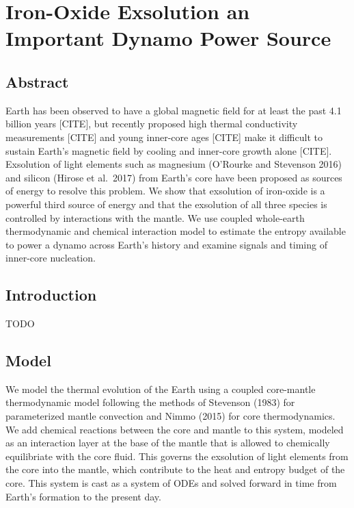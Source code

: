 \documentclass[]{article}
\date{}
\begin{document}
\hypertarget{iron-oxide-exsolution-an-important-dynamo-power-source}{%
\section{Iron-Oxide Exsolution an Important Dynamo Power
Source}\label{iron-oxide-exsolution-an-important-dynamo-power-source}}

\hypertarget{abstract}{%
\subsection{Abstract}\label{abstract}}

Earth has been observed to have a global magnetic field for at least the
past 4.1 billion years {[}CITE{]}, but recently proposed high thermal
conductivity measurements {[}CITE{]} and young inner-core ages
{[}CITE{]} make it difficult to sustain Earth's magnetic field by
cooling and inner-core growth alone {[}CITE{]}. Exsolution of light
elements such as magnesium (O'Rourke and Stevenson 2016) and silicon
(Hirose et al.~2017) from Earth's core have been proposed as sources of
energy to resolve this problem. We show that exsolution of iron-oxide is
a powerful third source of energy and that the exsolution of all three
species is controlled by interactions with the mantle. We use coupled
whole-earth thermodynamic and chemical interaction model to estimate the
entropy available to power a dynamo across Earth's history and examine
signals and timing of inner-core nucleation.

\hypertarget{introduction}{%
\subsection{Introduction}\label{introduction}}

TODO

\hypertarget{model}{%
\subsection{Model}\label{model}}

We model the thermal evolution of the Earth using a coupled core-mantle
thermodynamic model following the methods of Stevenson (1983) for
parameterized mantle convection and Nimmo (2015) for core
thermodynamics. We add chemical reactions between the core and mantle to
this system, modeled as an interaction layer at the base of the mantle
that is allowed to chemically equilibriate with the core fluid. This
governs the exsolution of light elements from the core into the mantle,
which contribute to the heat and entropy budget of the core. This system
is cast as a system of ODEs and solved forward in time from Earth's
formation to the present day.
\end{document}
